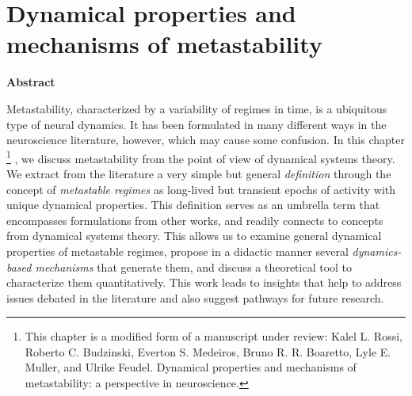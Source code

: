 \chapter{Dynamical properties and mechanisms of metastability}\label{chap:metastability}




\vspace{1.5em}
\noindent
{\large\textbf{Abstract}}\vspace{0.5cm}

Metastability, characterized by a variability of regimes in time, is a ubiquitous type of neural dynamics. It has been formulated in many different ways in the neuroscience literature, however, which may cause some confusion. In this chapter \footnote[1]{This chapter is a modified form of a manuscript under review: Kalel L. Rossi, Roberto C. Budzinski, Everton S. Medeiros, Bruno R. R. Boaretto, Lyle E. Muller, and Ulrike Feudel. Dynamical properties and mechanisms of metastability: a perspective in neuroscience.} , we discuss metastability from the point of view of dynamical systems theory. We extract from the literature a very simple but general \textit{definition} through the concept of \textit{metastable regimes} as long-lived but transient epochs of activity with unique dynamical properties. This definition serves as an umbrella term that encompasses formulations from other works, and readily connects to concepts from dynamical systems theory. This allows us to examine general dynamical properties of metastable regimes, propose in a didactic manner several \textit{dynamics-based mechanisms} that generate them, and discuss a theoretical tool to characterize them quantitatively. This work leads to insights that help to address issues debated in the literature and also suggest pathways for future research.
\vspace{1.5em}

